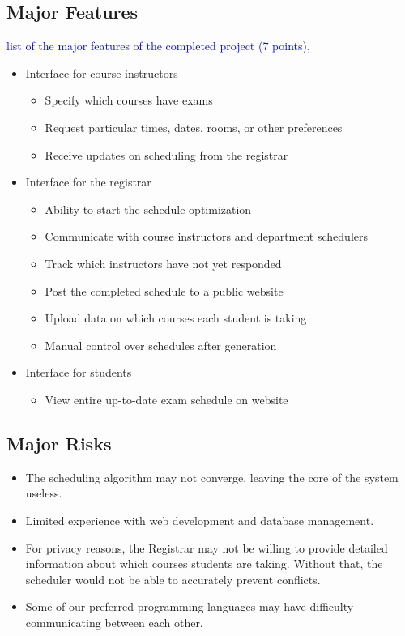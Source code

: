 \documentclass[11pt]{article}
\begin{document}
\subsection{Major Features} %
\textcolor{blue}{ list of the major features of the completed project (7 points),}
\begin{itemize}
\item Interface for course instructors
  \begin{itemize}
  \item Specify which courses have exams
  \item Request particular times, dates, rooms, or other preferences
  \item Receive updates on scheduling from the registrar
  \end{itemize}
\item Interface for the registrar
  \begin{itemize}
  \item Ability to start the schedule optimization
  \item Communicate with course instructors and department schedulers
  \item Track which instructors have not yet responded
  \item Post the completed schedule to a public website
  \item Upload data on which courses each student is taking %
  \item Manual control over schedules after generation
  \end{itemize}
\item Interface for students
  \begin{itemize}
  \item View entire up-to-date exam schedule on website
  \end{itemize}
\end{itemize}

\subsection{Major Risks} %

\begin{itemize}
\item The scheduling algorithm may not converge, leaving the core of the system useless.
\item Limited experience with web development and database management.
\item For privacy reasons, the Registrar may not be willing to provide detailed information about which courses students are taking. Without that, the scheduler would not be able to accurately prevent conflicts.
\item Some of our preferred programming languages may have difficulty communicating between each other. %
\end{itemize}
\end{document}
